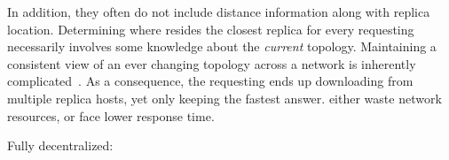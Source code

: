 \begin{asparadesc}


\noindent In addition, they often do not include distance information
along with replica location. Determining where resides the closest
replica for every requesting \process necessarily involves some
knowledge about the \emph{current} topology.  Maintaining a consistent
view of an ever changing topology across a network is inherently
complicated~\cite{topology-discovery,ospf}.
As a consequence, the requesting \node ends up downloading from multiple
replica hosts, yet only keeping the fastest answer. \Processes either
waste network resources, or face lower response time.







\item [Fully decentralized:]


\end{asparadesc}
